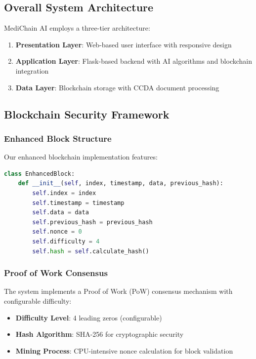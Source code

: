 \documentclass[12pt,a4paper]{article}
\begin{document}
\subsection{Overall System Architecture}

MediChain AI employs a three-tier architecture:
\begin{enumerate}
    \item \textbf{Presentation Layer}: Web-based user interface with responsive design
    \item \textbf{Application Layer}: Flask-based backend with AI algorithms and blockchain integration
    \item \textbf{Data Layer}: Blockchain storage with CCDA document processing
\end{enumerate}

\subsection{Blockchain Security Framework}

\subsubsection{Enhanced Block Structure}

Our enhanced blockchain implementation features:
\begin{lstlisting}[language=Python, caption=Enhanced Block Class]
class EnhancedBlock:
    def __init__(self, index, timestamp, data, previous_hash):
        self.index = index
        self.timestamp = timestamp
        self.data = data
        self.previous_hash = previous_hash
        self.nonce = 0
        self.difficulty = 4
        self.hash = self.calculate_hash()
\end{lstlisting}

\subsubsection{Proof of Work Consensus}

The system implements a Proof of Work (PoW) consensus mechanism with configurable difficulty:
\begin{itemize}
    \item \textbf{Difficulty Level}: 4 leading zeros (configurable)
    \item \textbf{Hash Algorithm}: SHA-256 for cryptographic security
    \item \textbf{Mining Process}: CPU-intensive nonce calculation for block validation
\end{itemize}
\end{document}
